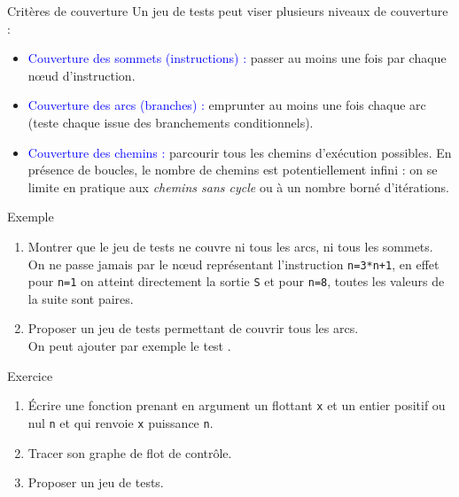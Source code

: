 \documentclass[10pt,french]{beamer}
\begin{document}
\begin{frame}{\Ctitle}{\stitle}
	\begin{alertblock}{Critères de couverture}
		Un jeu de tests peut viser plusieurs niveaux de couverture :
		\begin{itemize}
			\item<1-> \textcolor{blue}{Couverture des sommets (instructions) :} passer au moins une fois par chaque nœud d'instruction.
			\item<2-> \textcolor{blue}{Couverture des arcs (branches) :} emprunter au moins une fois chaque arc (teste chaque issue des branchements conditionnels).
			\item<3-> \textcolor{blue}{Couverture des chemins :} parcourir tous les chemins d'exécution possibles. En présence de boucles, le nombre de chemins est potentiellement infini : on se limite en pratique aux \textit{chemins sans cycle} ou à un nombre borné d'itérations.
		\end{itemize}
	\end{alertblock}
\end{frame}


\begin{frame}{\Ctitle}{\stitle}
	\begin{exampleblock}{Exemple}
		\begin{enumerate}
			\item<1-> Montrer que le jeu de tests  ne couvre ni tous les arcs, ni tous les sommets. \\
			\onslide<2->\textcolor{OliveGreen}{On ne passe jamais par le nœud représentant l'instruction {\tt n=3*n+1}, en effet pour {\tt n=1} on atteint directement la sortie {\tt S} et pour {\tt n=8}, toutes les valeurs de la suite sont paires.}
			\item<3-> Proposer un jeu de tests permettant de couvrir tous les arcs. \\
			\onslide<4->\textcolor{OliveGreen}{On peut ajouter par exemple le test .}
		\end{enumerate}
	\end{exampleblock}
	\begin{exampleblock}{Exercice}
		\begin{enumerate}
			\item<5-> Écrire une fonction prenant en argument un flottant {\tt x} et un entier positif ou nul {\tt n} et qui renvoie {\tt x} puissance {\tt n}.
			\item<6-> Tracer son graphe de flot de contrôle.
			\item<7-> Proposer un jeu de tests.
		\end{enumerate}
	\end{exampleblock}
\end{frame}
\end{document}
